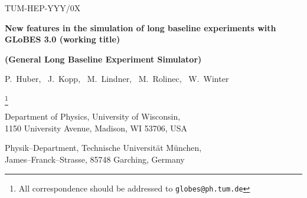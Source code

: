 \documentclass[12pt,a4paper]{article}
\begin{document}

\begin{titlepage}

\renewcommand{\thefootnote}{\alph{footnote}}

\vspace*{-3.cm}
\begin{flushright}
TUM-HEP-YYY/0X\\
\end{flushright}

\vspace*{0.5cm}

\renewcommand{\thefootnote}{\fnsymbol{footnote}}
\setcounter{footnote}{-1}

{\begin{center}
{\Large\bf New features in the simulation of long baseline experiments with GLoBES 3.0 (working title)}
\end{center}}
{\begin{center}
{\large\bf (General Long Baseline Experiment Simulator)}
\end{center}}
\renewcommand{\thefootnote}{\alph{footnote}}

\vspace*{.8cm}
{\begin{center} {\large{\sc
                P.~Huber\footnotemark[1],~
                J.~Kopp\footnotemark[2],~
                M.~Lindner\footnotemark[2],~
                M.~Rolinec\footnotemark[2],~
                W.~Winter\footnotemark[3]
                }}

\footnote{All correspondence should be addressed to {\tt globes@ph.tum.de}}

\end{center}}
\vspace*{0cm}
{\it
\begin{center}

\footnotemark[1]%
       Department of Physics, University of Wisconsin, \\
       1150 University Avenue, Madison, WI 53706, USA

\vspace*{1mm}

\footnotemark[2]%
       Physik--Department, Technische Universit\"at M\"unchen, \\
       James--Franck--Strasse, 85748 Garching, Germany


\end{center}}
\end{titlepage}
\end{document}
